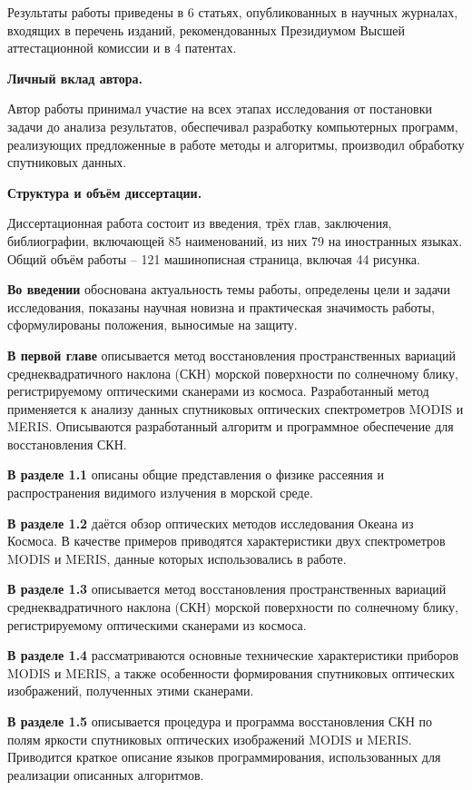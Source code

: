 Результаты работы приведены в 6 статьях, опубликованных в научных журналах, входящих в перечень изданий, рекомендованных Президиумом Высшей аттестационной комиссии и в 4 патентах.

\textbf{Личный вклад автора.}

Автор работы принимал участие на всех этапах исследования от постановки задачи до анализа результатов, обеспечивал разработку компьютерных программ, реализующих предложенные в работе методы и алгоритмы, производил обработку спутниковых данных. 

\textbf{Структура и объём диссертации.}

Диссертационная работа состоит из введения, трёх глав, заключения, библиографии, включающей 85 наименований, из них 79 на иностранных языках. Общий объём работы -- 121 машинописная страница, включая 44 рисунка.

\textbf{Во введении} обоснована актуальность темы работы, определены цели и задачи исследования, показаны научная новизна и практическая значимость работы, сформулированы положения, выносимые на защиту.

\textbf{В первой главе} описывается метод восстановления пространственных вариаций среднеквадратичного наклона (СКН) морской поверхности по солнечному блику, регистрируемому оптическими сканерами из космоса. Разработанный метод применяется к анализу данных спутниковых оптических спектрометров MODIS и MERIS. Описываются разработанный алгоритм и программное обеспечение для восстановления СКН.

\textbf{В разделе 1.1} описаны общие представления о физике рассеяния и распространения видимого излучения в морской среде.

\textbf{В разделе 1.2} даётся обзор оптических методов исследования Океана из Космоса. В качестве примеров приводятся характеристики двух спектрометров MODIS и MERIS, данные которых использовались в работе. 

\textbf{В разделе 1.3} описывается метод восстановления пространственных вариаций среднеквадратичного наклона (СКН) морской поверхности по солнечному блику, регистрируемому оптическими сканерами из космоса.

\textbf{В разделе 1.4} рассматриваются основные технические характеристики приборов MODIS и MERIS, а также особенности формирования спутниковых оптических изображений, полученных этими сканерами.

\textbf{В разделе 1.5} описывается процедура и программа восстановления СКН по полям яркости спутниковых оптических изображений MODIS и MERIS. Приводится краткое описание языков программирования, использованных для реализации описанных алгоритмов.

